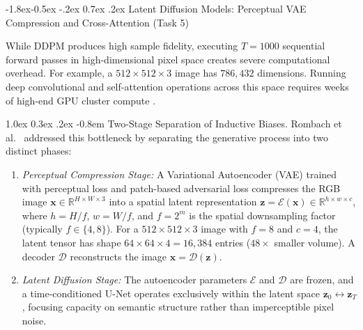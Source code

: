 \documentclass[10pt,a4paper]{article}
\makeatletter
\renewcommand\subsection{\@startsection{subsection}{2}{\z@}%
                                     {-1.8ex\@plus -0.5ex \@minus -.2ex}%
                                     {0.7ex \@plus .2ex}%
                                     {\normalfont\normalsize\bfseries}}
\renewcommand\paragraph{\@startsection{paragraph}{4}{\z@}%
                                    {1.0ex \@plus 0.3ex \@minus .2ex}%
                                    {-0.8em}%
                                    {\normalfont\normalsize\bfseries}}
\makeatother
\begin{document}
\subsection{Latent Diffusion Models: Perceptual VAE Compression and Cross-Attention (Task 5)}
\label{sec:method_ldm_arch}

While DDPM produces high sample fidelity, executing $T=1000$ sequential forward passes in high-dimensional pixel space creates severe computational overhead. For example, a $512 \times 512 \times 3$ image has $786{,}432$ dimensions. Running deep convolutional and self-attention operations across this space requires weeks of high-end GPU cluster compute \cite{rombach2022high}.

\paragraph{Two-Stage Separation of Inductive Biases.}
Rombach et al.\ \cite{rombach2022high} addressed this bottleneck by separating the generative process into two distinct phases:
\begin{enumerate}[leftmargin=1.8em, itemsep=0.25em]
    \item \textit{Perceptual Compression Stage:} A Variational Autoencoder (VAE) trained with perceptual loss and patch-based adversarial loss compresses the RGB image $\mathbf{x} \in \mathbb{R}^{H \times W \times 3}$ into a spatial latent representation $\mathbf{z} = \mathcal{E}(\mathbf{x}) \in \mathbb{R}^{h \times w \times c}$, where $h = H/f$, $w = W/f$, and $f = 2^m$ is the spatial downsampling factor (typically $f \in \{4, 8\}$). For a $512 \times 512 \times 3$ image with $f=8$ and $c=4$, the latent tensor has shape $64 \times 64 \times 4 = 16{,}384$ entries ($48\times$ smaller volume). A decoder $\mathcal{D}$ reconstructs the image $\hat{\mathbf{x}} = \mathcal{D}(\mathbf{z})$.
    \item \textit{Latent Diffusion Stage:} The autoencoder parameters $\mathcal{E}$ and $\mathcal{D}$ are frozen, and a time-conditioned U-Net operates exclusively within the latent space $\mathbf{z}_0 \leftrightarrow \mathbf{z}_T$, focusing capacity on semantic structure rather than imperceptible pixel noise.
\end{enumerate}
\end{document}
